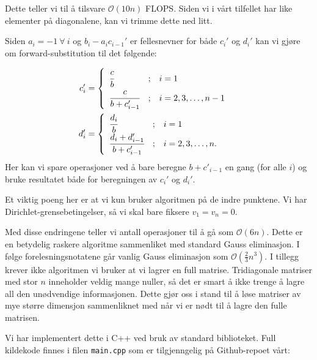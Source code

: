 \documentclass[11pt]{article}
\begin{document}
Dette teller vi til å tilsvare $\mathcal{O}(10n)$ FLOPS. Siden vi i
vårt tilfellet har like elementer på diagonalene, kan vi trimme dette
ned litt. 

Siden $a_i = -1\ \forall\  i$ og  $b_i - a_ic_{i-1}'$ er fellesnevner
for både $c_i'$ og $d_i'$ kan vi gjøre om forward-substitution til det følgende:

\begin{align*}
  c_i' &= \begin{cases}
\begin{array}{lcl}
  \cfrac{c}{b}                  & ; & i = 1 \\
  \cfrac{c}{b + c'_{i - 1}} & ; & i = 2, 3, \dots, n-1 \\
\end{array}
\end{cases}\\
d_i' &= \begin{cases}
\begin{array}{lcl}
  \cfrac{d_i}{b}                  & ; & i = 1 \\
  \cfrac{d_i + d'_{i - 1}}{b + c'_{i - 1}} & ; & i = 2, 3, \dots, n. \\
\end{array}
\end{cases}
\end{align*}
Her kan vi spare operasjoner ved å bare beregne $b+c'_{i-1}$ en gang
(for alle $i$) og bruke resultatet både for beregningen av $c_{i}'$ og
$d_{i}'$.

Et viktig poeng her er at vi kun bruker algoritmen på de indre
punktene. Vi har Dirichlet-grensebetingelser, så vi skal bare fiksere
$v_1 = v_n = 0$.

Med disse endringene teller vi antall operasjoner til å gå som
$\mathcal{O}(6n)$. Dette er en betydelig raskere algoritme sammenliket
med standard Gauss eliminasjon. I følge forelesningsnotatene går
vanlig Gauss eliminasjon som $\mathcal{O}(\frac{ 2 }{ 3 }n^3)$. I tillegg krever ikke algoritmen vi bruker at vi lagrer en full
matrise. Tridiagonale matriser med stor $n$ inneholder veldig mange
nuller, så det er smart å ikke trenge å lagre all den unødvendige
informasjonen. Dette gjør oss i stand til å løse matriser av mye
større dimensjon sammenliknet med når vi er nødt til å lagre den fulle matrisen.

Vi har implementert dette i C++ ved bruk av standard biblioteket. Full
kildekode finnes i filen \texttt{main.cpp} som er tilgjenngelig på
Github-repoet vårt\footnotemark[1]:
\end{document}
